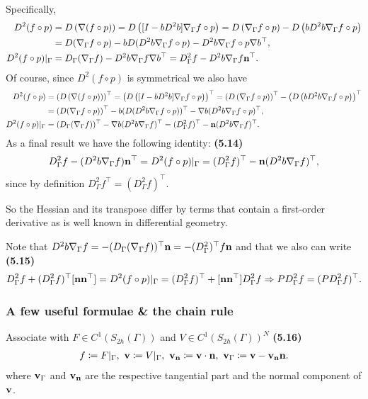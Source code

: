 \documentclass[oneside]{book}
\numberwithin{equation}{section}
\begin{document}
Specifically,
\begin{align*}
    D^2(f\circ p) &= D\left(\nabla(f\circ p)\right) = D\left([I - bD^2b]\nabla_\Gamma f\circ p\right) = D\left(\nabla_\Gamma f\circ p\right) - D\left(bD^2b\nabla_\Gamma f\circ p\right)\\
    &= D(\nabla_\Gamma f\circ p) - bD(D^2b\nabla_\Gamma f\circ p) - D^2b\nabla_\Gamma f\circ p\nabla b^\top,\\
    D^2(f\circ p)|_\Gamma &= D_\Gamma(\nabla_\Gamma f) - D^2b\nabla_\Gamma f\nabla b^\top = D_\Gamma^2f - D^2b\nabla_\Gamma f{\bf n}^\top.
\end{align*}
Of course, since $D^2(f\circ p)$ is symmetrical we also have
\begin{align*}
    D^2(f\circ p) &= \left(D\left(\nabla(f\circ p)\right)\right)^\top = \left(D\left([I - bD^2b]\nabla_\Gamma f\circ p\right)\right)^\top = \left(D\left(\nabla_\Gamma f\circ p\right)\right)^\top - \left(D\left(bD^2b\nabla_\Gamma f\circ p\right)\right)^\top\\
    &= \left(D(\nabla_\Gamma f\circ p)\right)^\top - b(D(D^2b\nabla_\Gamma f\circ p))^\top - \nabla b(D^2b\nabla_\Gamma f\circ p)^\top,\\
    D^2(f\circ p)|_\Gamma &= (D_\Gamma(\nabla_\Gamma f))^\top - \nabla b(D^2b\nabla_\Gamma f)^\top = (D_\Gamma^2f)^\top - {\bf n}(D^2b\nabla_\Gamma f)^\top.
\end{align*}
As a final result we have the following identity: \textbf{(5.14)}
\begin{align*}
    D_\Gamma^2f - (D^2b\nabla_\Gamma f){\bf n}^\top = D^2(f\circ p)|_\Gamma = (D_\Gamma^2f)^\top - {\bf n}(D^2b\nabla_\Gamma f)^\top,
\end{align*}
since by definition $D_\Gamma^2f^\top = (D_\Gamma^2f)^\top$.

So the Hessian and its transpose differ by terms that contain a first-order derivative as is well known in differential geometry.

Note that $D^2b\nabla_\Gamma f = -(D_\Gamma(\nabla_\Gamma f))^\top{\bf n} = -(D_\Gamma^2)^\top f{\bf n}$ and that we also can write \textbf{(5.15)}
\begin{align*}
    D_\Gamma^2f + (D_\Gamma^2f)^\top[{\bf n}{\bf n}^\top] = D^2(f\circ p)|_\Gamma = (D_\Gamma^2f)^\top + [{\bf n}{\bf n}^\top]D_\Gamma^2f\Rightarrow PD_\Gamma^2f = (PD_\Gamma^2f)^\top.
\end{align*}

\subsubsection{A few useful formulae \& the chain rule}
Associate with $F\in C^1(S_{2h}(\Gamma))$ and $V\in C^1(S_{2h}(\Gamma))^N$ \textbf{(5.16)}
\begin{align*}
    f\coloneqq F|_\Gamma,\ {\bf v}\coloneqq V|_\Gamma,\ {\bf v}_{\bf n}\coloneqq{\bf v}\cdot{\bf n},\ {\bf v}_\Gamma\coloneqq{\bf v} - {\bf v}_{\bf n}{\bf n}.
\end{align*}
where ${\bf v}_\Gamma$ and ${\bf v}_{\bf n}$ are the respective tangential part and the normal component of ${\bf v}$.
\end{document}
